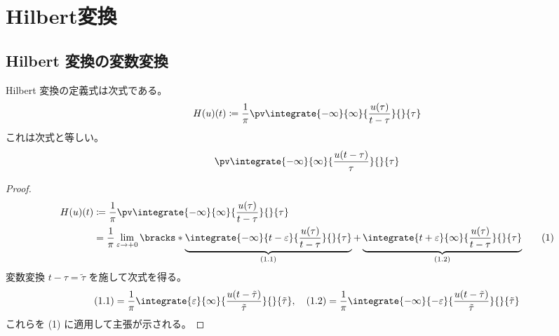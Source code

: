 \part{Hilbert変換}
    \newcommand*{\HilbertTransform}[1]{\mathrm{H}\parens*{#1}}
    \chapter{Hilbert 変換の変数変換}
        \label{Hilbert 変換の変数変換}
        \begin{shadebox}
            Hilbert 変換の定義式は次式である。
            \[ H(u)(t)\coloneq\frac{1}{\pi}\pv\integrate{-\infty}{\infty}{\frac{u(\tau)}{t-\tau}}{}{\tau} \]
            これは次式と等しい。
            \[ \pv\integrate{-\infty}{\infty}{\frac{u(t-\tau)}{\tau}}{}{\tau} \]
        \end{shadebox}
        \begin{proof}
            \quad\par
            \begin{align*}
                H(u)(t) &\coloneq\frac{1}{\pi}\pv\integrate{-\infty}{\infty}{\frac{u(\tau)}{t-\tau}}{}{\tau} \\
                &= \frac{1}{\pi}\lim_{\varepsilon\to +0}\bracks*{\underbrace{\integrate{-\infty}{t-\varepsilon}{\frac{u(\tau)}{t-\tau}}{}{\tau}}_{(1.1)} + \underbrace{\integrate{t+\varepsilon}{\infty}{\frac{u(\tau)}{t-\tau}}{}{\tau}}_{(1.2)}} \tag{1}
            \end{align*}
            変数変換 $t-\tau = \tilde{\tau}$ を施して次式を得る。
            \[ (1.1) = \frac{1}{\pi}\integrate{\varepsilon}{\infty}{\frac{u(t-\tilde{\tau})}{\tilde{\tau}}}{}{\tilde{\tau}},\quad (1.2) = \frac{1}{\pi}\integrate{-\infty}{-\varepsilon}{\frac{u(t-\tilde{\tau})}{\tilde{\tau}}}{}{\tilde{\tau}} \]
            これらを (1) に適用して主張が示される。
        \end{proof}
